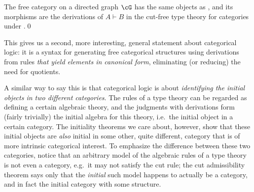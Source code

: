 \documentclass{book}
\let\types\vdash
\begin{document}
\begin{thm}\label{thm:category-initial-2}
  The free category on a directed graph $\cG$ has the same objects as \cG, and its morphisms are the derivations of $A\types B$ in the cut-free type theory for categories under \cG.\qed
\end{thm}

This gives us a second, more interesting, general statement about categorical logic: it is
{a syntax for generating free categorical structures using derivations from rules}
\emph{that yield elements in canonical form}, eliminating (or reducing) the need for quotients.

A similar way to say this is that categorical logic is about \emph{identifying the initial objects in two different categories}.
The rules of a type theory can be regarded as defining a certain algebraic theory, and the judgments with derivations form (fairly trivially) the initial algebra for this theory, i.e.\ the initial object in a certain category.
The initiality theorems we care about, however, show that these initial objects are \emph{also} initial in some other, quite different, category that is of more intrinsic categorical interest.
To emphasize the difference between these two categories, notice that an arbitrary model of the algebraic rules of a type theory is not even a category, e.g.\ it may not satisfy the cut rule; the cut admissibility theorem says only that the \emph{initial} such model happens to actually be a category, and in fact the initial category with some structure.
\end{document}
